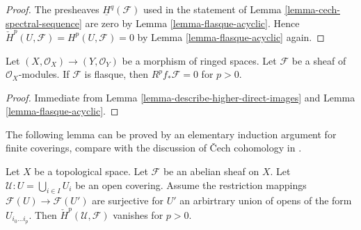 \begin{proof}
The presheaves $\underline{H}^q(\mathcal{F})$ used in the statement
of Lemma \ref{lemma-cech-spectral-sequence} are zero by
Lemma \ref{lemma-flasque-acyclic}.
Hence $\check{H}^p(U, \mathcal{F}) = H^p(U, \mathcal{F}) = 0$
by Lemma \ref{lemma-flasque-acyclic} again.
\end{proof}

\begin{lemma}
\label{lemma-flasque-acyclic-pushforward}
Let $(X, \mathcal{O}_X) \to (Y, \mathcal{O}_Y)$ be a morphism
of ringed spaces. Let $\mathcal{F}$ be a sheaf of $\mathcal{O}_X$-modules.
If $\mathcal{F}$ is flasque, then
$R^pf_*\mathcal{F} = 0$ for $p > 0$.
\end{lemma}

\begin{proof}
Immediate from 
Lemma \ref{lemma-describe-higher-direct-images} and
Lemma \ref{lemma-flasque-acyclic}.
\end{proof}

\noindent
The following lemma can be proved by an elementary induction
argument for finite coverings, compare with the discussion
of {\v C}ech cohomology in \cite{FOAG}.

\begin{lemma}
\label{lemma-vanishing-ravi}
Let $X$ be a topological space. Let $\mathcal{F}$ be an abelian sheaf
on $X$. Let $\mathcal{U} : U = \bigcup_{i \in I} U_i$ be an
open covering. Assume the restriction mappings
$\mathcal{F}(U) \to \mathcal{F}(U')$ are surjective
for $U'$ an arbirtrary union of opens of the form $U_{i_0 \ldots i_p}$.
Then $\check{H}^p(\mathcal{U}, \mathcal{F})$
vanishes for $p > 0$.
\end{lemma}

